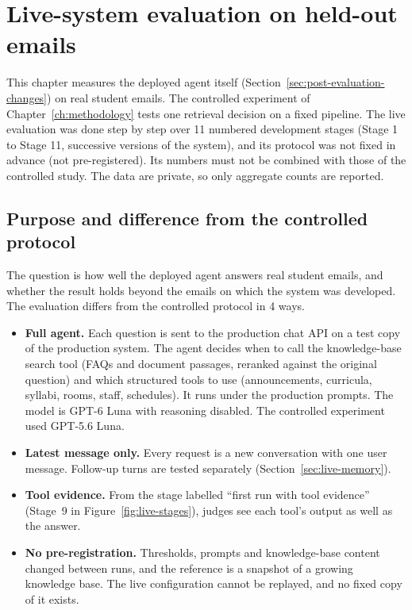 \section{Live-system evaluation on held-out emails}
\label{ch:live}

This chapter measures the deployed agent itself (Section~\ref{sec:post-evaluation-changes}) on real student emails. The controlled experiment of Chapter~\ref{ch:methodology} tests one retrieval decision on a fixed pipeline. The live evaluation was done step by step over 11 numbered development stages (Stage 1 to Stage 11, successive versions of the system), and its protocol was not fixed in advance (not pre-registered). Its numbers must not be combined with those of the controlled study. The data are private, so only aggregate counts are reported.

\subsection{Purpose and difference from the controlled protocol}

The question is how well the deployed agent answers real student emails, and whether the result holds beyond the emails on which the system was developed. The evaluation differs from the controlled protocol in 4 ways.

\begin{itemize}
  \item \textbf{Full agent.} Each question is sent to the production chat API on a test copy of the production system. The agent decides when to call the knowledge-base search tool (FAQs and document passages, reranked against the original question) and which structured tools to use (announcements, curricula, syllabi, rooms, staff, schedules). It runs under the production prompts. The model is GPT-6 Luna with reasoning disabled. The controlled experiment used GPT-5.6 Luna.
  \item \textbf{Latest message only.} Every request is a new conversation with one user message. Follow-up turns are tested separately (Section~\ref{sec:live-memory}).
  \item \textbf{Tool evidence.} From the stage labelled ``first run with tool evidence'' (Stage~9 in Figure~\ref{fig:live-stages}), judges see each tool's output as well as the answer.
  \item \textbf{No pre-registration.} Thresholds, prompts and knowledge-base content changed between runs, and the reference is a snapshot of a growing knowledge base. The live configuration cannot be replayed, and no fixed copy of it exists.
\end{itemize}

